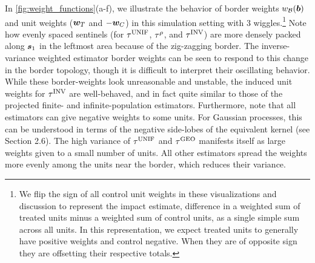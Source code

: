 In \autoref{fig:weight_functions}(a-f), we illustrate the behavior of border weights \(w_{\mathcal{B}}(\bm{b})\) and unit weights (\(\bm{w}_{T}\) and \(-\bm{w}_{C}\)) in this simulation setting with 3 wiggles.\footnote{We flip the sign of all control unit weights in these visualizations and discussion to represent the impact estimate, difference in a weighted sum of treated units minus a weighted sum of control units, as a single simple sum across all units. In this representation, we expect treated units to generally have positive weights and control negative. When they are of opposite sign they are offsetting their respective totals.}
Note how evenly spaced sentinels (for \(\tau^{\mathrm{UNIF}}\), \(\tau^{\rho}\), and \(\tau^{\mathrm{INV}}\)) are more densely packed along \(\bm{s}_1\) in the leftmost area because of the zig-zagging border.
The inverse-variance weighted estimator border weights can be seen to respond to this change in the border topology, though it is difficult to interpret their oscillating behavior.
While these border-weights look unreasonable and unstable, the induced unit weights for \(\tau^{\mathrm{INV}}\) are well-behaved, and in fact quite similar to those of the projected finite- and infinite-population estimators.
Furthermore, note that all estimators can give negative weights to some units.
For Gaussian processes, this can be understood in terms of the negative side-lobes of the equivalent kernel (see \cite{rasmussen2006gaussian} Section 2.6).
The high variance of \(\tau^{\mathrm{UNIF}}\) and \(\tau^{\mathrm{GEO}}\) manifests itself as large weights given to a small number of units.
All other estimators spread the weights more evenly among the units near the border, which reduces their variance.

